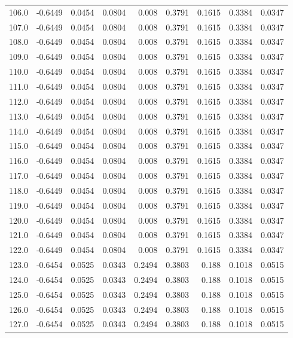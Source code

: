 \begin{longtable}{lrrrrrrrr}
106.0 & -0.6449 & 0.0454 & 0.0804 & 0.008 & 0.3791 & 0.1615 & 0.3384 & 0.0347 \\
107.0 & -0.6449 & 0.0454 & 0.0804 & 0.008 & 0.3791 & 0.1615 & 0.3384 & 0.0347 \\
108.0 & -0.6449 & 0.0454 & 0.0804 & 0.008 & 0.3791 & 0.1615 & 0.3384 & 0.0347 \\
109.0 & -0.6449 & 0.0454 & 0.0804 & 0.008 & 0.3791 & 0.1615 & 0.3384 & 0.0347 \\
110.0 & -0.6449 & 0.0454 & 0.0804 & 0.008 & 0.3791 & 0.1615 & 0.3384 & 0.0347 \\
111.0 & -0.6449 & 0.0454 & 0.0804 & 0.008 & 0.3791 & 0.1615 & 0.3384 & 0.0347 \\
112.0 & -0.6449 & 0.0454 & 0.0804 & 0.008 & 0.3791 & 0.1615 & 0.3384 & 0.0347 \\
113.0 & -0.6449 & 0.0454 & 0.0804 & 0.008 & 0.3791 & 0.1615 & 0.3384 & 0.0347 \\
114.0 & -0.6449 & 0.0454 & 0.0804 & 0.008 & 0.3791 & 0.1615 & 0.3384 & 0.0347 \\
115.0 & -0.6449 & 0.0454 & 0.0804 & 0.008 & 0.3791 & 0.1615 & 0.3384 & 0.0347 \\
116.0 & -0.6449 & 0.0454 & 0.0804 & 0.008 & 0.3791 & 0.1615 & 0.3384 & 0.0347 \\
117.0 & -0.6449 & 0.0454 & 0.0804 & 0.008 & 0.3791 & 0.1615 & 0.3384 & 0.0347 \\
118.0 & -0.6449 & 0.0454 & 0.0804 & 0.008 & 0.3791 & 0.1615 & 0.3384 & 0.0347 \\
119.0 & -0.6449 & 0.0454 & 0.0804 & 0.008 & 0.3791 & 0.1615 & 0.3384 & 0.0347 \\
120.0 & -0.6449 & 0.0454 & 0.0804 & 0.008 & 0.3791 & 0.1615 & 0.3384 & 0.0347 \\
121.0 & -0.6449 & 0.0454 & 0.0804 & 0.008 & 0.3791 & 0.1615 & 0.3384 & 0.0347 \\
122.0 & -0.6449 & 0.0454 & 0.0804 & 0.008 & 0.3791 & 0.1615 & 0.3384 & 0.0347 \\
123.0 & -0.6454 & 0.0525 & 0.0343 & 0.2494 & 0.3803 & 0.188 & 0.1018 & 0.0515 \\
124.0 & -0.6454 & 0.0525 & 0.0343 & 0.2494 & 0.3803 & 0.188 & 0.1018 & 0.0515 \\
125.0 & -0.6454 & 0.0525 & 0.0343 & 0.2494 & 0.3803 & 0.188 & 0.1018 & 0.0515 \\
126.0 & -0.6454 & 0.0525 & 0.0343 & 0.2494 & 0.3803 & 0.188 & 0.1018 & 0.0515 \\
127.0 & -0.6454 & 0.0525 & 0.0343 & 0.2494 & 0.3803 & 0.188 & 0.1018 & 0.0515 \\

\end{longtable}
